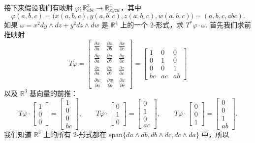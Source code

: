 接下来假设我们有映射 $\varphi:\mathbb{R}^3_{abc}\to\mathbb{R}^4_{xyzw}$，其中
\[
\varphi(a,b,c)=\bigl(x(a,b,c),y(a,b,c),z(a,b,c),w(a,b,c)\bigr)=(a,b,c,abc).
\]
如果 $\omega=x^2dy\wedge dz+y^2dz\wedge dw$ 是 $\mathbb{R}^4$ 上的一个 2-形式，求 $T^*\varphi\cdot\omega$. 首先我们求前推映射
\[
T\varphi=
\begin{bmatrix}
\frac{\partial x}{\partial a}&\frac{\partial x}{\partial b}&\frac{\partial x}{\partial c}\\
\frac{\partial y}{\partial a}&\frac{\partial y}{\partial b}&\frac{\partial y}{\partial c}\\
\frac{\partial z}{\partial a}&\frac{\partial z}{\partial b}&\frac{\partial z}{\partial c}\\
\frac{\partial w}{\partial a}&\frac{\partial w}{\partial b}&\frac{\partial w}{\partial c}
\end{bmatrix}
=
\begin{bmatrix}
1&0&0\\
0&1&0\\
0&0&1\\
bc&ac&ab
\end{bmatrix}
\]
以及 $\mathbb{R}^3$ 基向量的前推：
\[
T\varphi\cdot\begin{bmatrix}1\\0\\0\end{bmatrix}
=
\begin{bmatrix}1\\0\\0\\bc\end{bmatrix},\qquad
T\varphi\cdot\begin{bmatrix}0\\1\\0\end{bmatrix}
=
\begin{bmatrix}0\\1\\0\\ac\end{bmatrix},\qquad
T\varphi\cdot\begin{bmatrix}0\\0\\1\end{bmatrix}
=
\begin{bmatrix}0\\0\\1\\ab\end{bmatrix}.
\]
我们知道 $\mathbb{R}^3$ 上的所有 2-形式都在 $\mathrm{span}\{da\wedge db,db\wedge dc,dc\wedge da\}$ 中，所以
